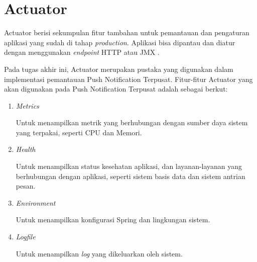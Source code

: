 \section{Actuator}
\par Actuator berisi sekumpulan fitur tambahan untuk pemantauan dan pengaturan aplikasi yang sudah di tahap \textit{production}. Aplikasi bisa dipantau dan diatur dengan menggunakan \textit{endpoint} HTTP atau JMX \cite{actuator-online}.
\par Pada tugas akhir ini, Actuator merupakan pustaka yang digunakan dalam implementasi pemantauan Push Notification Terpusat. Fitur-fitur Actuator yang akan digunakan pada Push Notification Terpusat adalah sebagai berkut:
\begin{enumerate}[listparindent=2.5em]
	\item \textit{Metrics}
	\par Untuk menampilkan metrik yang berhubungan dengan sumber daya sistem yang terpakai, seperti CPU dan Memori.
	\item \textit{Health}
	\par Untuk menampilkan status kesehatan aplikasi, dan layanan-layanan yang berhubungan dengan aplikasi, seperti sistem basis data dan sistem antrian pesan.
	\item \textit{Environment}
	\par Untuk menampilkan konfigurasi Spring dan lingkungan sistem.
	\item \textit{Logfile}
	\par Untuk menampilkan \textit{log} yang dikeluarkan oleh sistem.
\end{enumerate}

